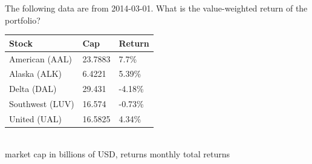 The following data are from 2014-03-01. What is the value-weighted return of the portfolio?
\begin{center}
	\begin{tabular}{l|ll}
		\textbf{Stock} & \textbf{Cap} & \textbf{Return} \\ \hline
		American (AAL) & 23.7883 & 7.7\% \\
		Alaska (ALK) & 6.4221 & 5.39\% \\
		Delta (DAL) & 29.431 & -4.18\% \\
		Southwest (LUV) & 16.574 & -0.73\% \\
		United (UAL) & 16.5825 & 4.34\%\\\hline
	\end{tabular}\\
	{\footnotesize market cap in billions of USD, returns monthly total returns}
\end{center}
